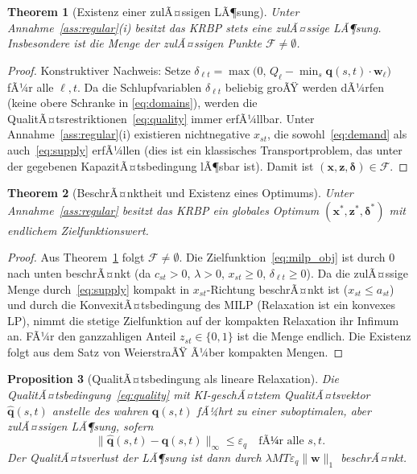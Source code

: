 ﻿\documentclass[12pt,a4paper]{article}
\theoremstyle{plain}
\newtheorem{theorem}{Theorem}[section]
\newtheorem{proposition}[theorem]{Proposition}
\theoremstyle{definition}
\begin{document}
	\begin{theorem}[Existenz einer zulÃ¤ssigen LÃ¶sung]
		\label{thm:feasible}
		Unter Annahme~\ref{ass:regular}(i) besitzt das KRBP stets eine zulÃ¤ssige
		LÃ¶sung. Insbesondere ist die Menge der zulÃ¤ssigen Punkte
		$\mathcal{F} \neq \emptyset$.
	\end{theorem}
	
	\begin{proof}
		Konstruktiver Nachweis: Setze $\delta_{\ell t} = \max\bigl(0,\,
		Q_\ell - \min_s \mathbf{q}(s,t)\cdot\mathbf{w}_\ell\bigr)$ fÃ¼r alle
		$\ell, t$. Da die Schlupfvariablen $\delta_{\ell t}$ beliebig groÃŸ
		werden dÃ¼rfen (keine obere Schranke in \eqref{eq:domains}), werden
		die QualitÃ¤tsrestriktionen~\eqref{eq:quality} immer erfÃ¼llbar.
		Unter Annahme~\ref{ass:regular}(i) existieren nichtnegative $x_{st}$,
		die sowohl~\eqref{eq:demand} als auch~\eqref{eq:supply} erfÃ¼llen
		(dies ist ein klassisches Transportproblem, das unter der gegebenen
		KapazitÃ¤tsbedingung lÃ¶sbar ist). Damit ist $(\mathbf{x},\mathbf{z},
		\boldsymbol{\delta}) \in \mathcal{F}$.
	\end{proof}
	
	\begin{theorem}[BeschrÃ¤nktheit und Existenz eines Optimums]
		\label{thm:bounded}
		Unter Annahme~\ref{ass:regular} besitzt das KRBP ein globales Optimum
		$(\mathbf{x}^*, \mathbf{z}^*, \boldsymbol{\delta}^*)$ mit endlichem
		Zielfunktionswert.
	\end{theorem}
	
	\begin{proof}
		Aus Theorem~\ref{thm:feasible} folgt $\mathcal{F} \neq \emptyset$.
		Die Zielfunktion~\eqref{eq:milp_obj} ist durch 0 nach unten beschrÃ¤nkt
		(da $c_{st} > 0$, $\lambda > 0$, $x_{st} \geq 0$, $\delta_{\ell t}
		\geq 0$). Da die zulÃ¤ssige Menge durch~\eqref{eq:supply} kompakt in
		$x_{st}$-Richtung beschrÃ¤nkt ist ($x_{st} \leq a_{st}$) und durch die
		KonvexitÃ¤tsbedingung des MILP (Relaxation ist ein konvexes LP), nimmt
		die stetige Zielfunktion auf der kompakten Relaxation ihr Infimum an.
		FÃ¼r den ganzzahligen Anteil $z_{st} \in \{0,1\}$ ist die Menge endlich.
		Die Existenz folgt aus dem Satz von WeierstraÃŸ Ã¼ber kompakten Mengen.
	\end{proof}
	
	\begin{proposition}[QualitÃ¤tsbedingung als lineare Relaxation]
		Die QualitÃ¤tsbedingung~\eqref{eq:quality} mit KI-geschÃ¤tztem
		QualitÃ¤tsvektor $\hat{\mathbf{q}}(s,t)$ anstelle des wahren
		$\mathbf{q}(s,t)$ fÃ¼hrt zu einer suboptimalen, aber zulÃ¤ssigen LÃ¶sung,
		sofern
		\[
		\bigl\|\hat{\mathbf{q}}(s,t) - \mathbf{q}(s,t)\bigr\|_\infty
		\leq \varepsilon_q \quad\text{fÃ¼r alle } s, t.
		\]
		Der QualitÃ¤tsverlust der LÃ¶sung ist dann durch $\lambda M T \varepsilon_q
		\|\mathbf{w}\|_1$ beschrÃ¤nkt.
	\end{proposition}
	
\end{document}
